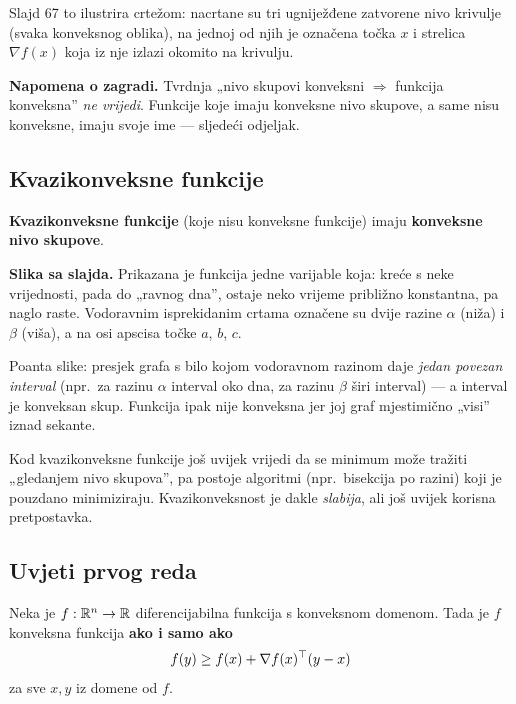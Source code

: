 Slajd 67 to ilustrira crtežom: nacrtane su tri ugniježđene zatvorene nivo
krivulje (svaka konveksnog oblika), na jednoj od njih je označena točka $x$ i
strelica $\nabla f(x)$ koja iz nje izlazi okomito na krivulju.

\textbf{Napomena o zagradi.} Tvrdnja „nivo skupovi konveksni $\Rightarrow$
funkcija konveksna” \emph{ne vrijedi}. Funkcije koje imaju konveksne nivo
skupove, a same nisu konveksne, imaju svoje ime --- sljedeći odjeljak.

\subsection{Kvazikonveksne funkcije}

\begin{definicija}
\textbf{Kvazikonveksne funkcije} (koje nisu konveksne funkcije) imaju
\textbf{konveksne nivo skupove}.
\end{definicija}

\textbf{Slika sa slajda.} Prikazana je funkcija jedne varijable koja: kreće s
neke vrijednosti, pada do „ravnog dna”, ostaje neko vrijeme približno
konstantna, pa naglo raste. Vodoravnim isprekidanim crtama označene su dvije
razine $\alpha$ (niža) i $\beta$ (viša), a na osi apscisa točke $a$, $b$, $c$.

Poanta slike: presjek grafa s bilo kojom vodoravnom razinom daje \emph{jedan
povezan interval} (npr.\ za razinu $\alpha$ interval oko dna, za razinu $\beta$
širi interval) --- a interval je konveksan skup. Funkcija ipak nije konveksna
jer joj graf mjestimično „visi” iznad sekante.

\begin{napomena}
Kod kvazikonveksne funkcije još uvijek vrijedi da se minimum može tražiti
„gledanjem nivo skupova”, pa postoje algoritmi (npr.\ bisekcija po razini) koji
je pouzdano minimiziraju. Kvazikonveksnost je dakle \emph{slabija}, ali još
uvijek korisna pretpostavka.
\end{napomena}

\subsection{Uvjeti prvog reda}

\begin{teorem}
Neka je $f : \mathbb{R}^n \to \mathbb{R}$ diferencijabilna funkcija s konveksnom domenom. Tada
je $f$ konveksna funkcija \textbf{ako i samo ako}
\[
f(y) \ge f(x) + \nabla f(x)^{\top}(y - x)
\]
za sve $x, y$ iz domene od $f$.
\end{teorem}

